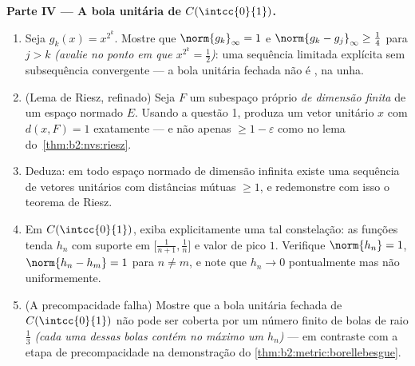 \begin{problem}
\medskip
\noindent\textbf{Parte IV --- A bola unitária de
$C(\intcc{0}{1})$.}
\begin{enumerate}[resume]
  \item Seja $g_k(x) = x^{2^k}$. Mostre que $\norm{g_k}_\infty = 1$ e
        $\norm{g_k - g_j}_\infty \geq \frac14$ para $j > k$
        \emph{(avalie no ponto em que $x^{2^k} =
        \frac12$)}: uma sequência limitada explícita sem
        subsequência convergente --- a bola unitária fechada não é
        , na unha.
  \item (Lema de Riesz, refinado) Seja $F$ um subespaço próprio
        \emph{de dimensão finita} de um espaço normado
        $E$. Usando a questão 1, produza um vetor unitário $x$
        com $d(x, F) = 1$ exatamente --- e não apenas $\geq 1 -
        \varepsilon$ como no lema do~\cref{thm:b2:nvs:riesz}.
  \item Deduza: em todo espaço normado de dimensão infinita existe
        uma sequência de vetores unitários com distâncias mútuas
        $\geq 1$, e redemonstre com isso o teorema de Riesz.
  \item Em $C(\intcc{0}{1})$, exiba explicitamente uma tal constelação:
        as funções tenda $h_n$ com suporte em
        $\bigl[\frac1{n+1}, \frac1n\bigr]$ e valor de pico $1$.
        Verifique $\norm{h_n} = 1$, $\norm{h_n - h_m} = 1$ para $n
        \neq m$, e note que $h_n \to 0$ pontualmente mas não
        uniformemente.
  \item (A precompacidade falha) Mostre que a bola unitária fechada
        de $C(\intcc{0}{1})$ não pode ser coberta por um número finito de
        bolas de raio $\frac13$ \emph{(cada uma dessas bolas contém
        no máximo um $h_n$)} --- em contraste com a
        etapa de precompacidade na demonstração do
        \cref{thm:b2:metric:borellebesgue}.
\end{enumerate}


\end{problem}
